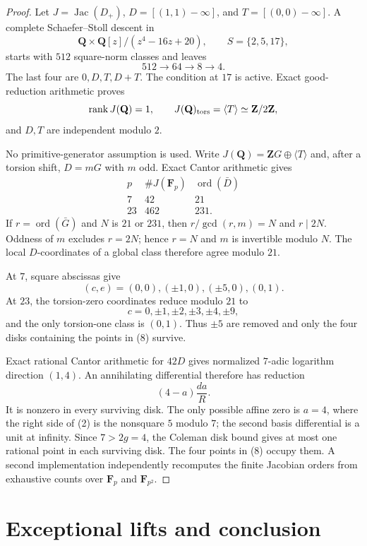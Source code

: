 \documentclass[11pt]{article}
\newcommand{\Q}{\mathbf Q}
\begin{document}
\begin{proof}
Let $J=\operatorname{Jac}(D_+)$,
$D=[(1,1)-\infty]$, and $T=[(0,0)-\infty]$.
A complete Schaefer--Stoll descent in
\[
 \Q\times\Q[z]/(z^4-16z+20),\qquad S=\{2,5,17\},
\]
starts with $512$ square-norm classes and leaves
\[
 512\longrightarrow64\longrightarrow8\longrightarrow4.
\]
The last four are $0,D,T,D+T$.  The condition at $17$ is active.  Exact
good-reduction arithmetic proves
\[
 \operatorname{rank}J(\Q)=1,\qquad
 J(\Q)_{\rm tors}=\langle T\rangle\simeq\mathbf Z/2\mathbf Z,
\]
and $D,T$ are independent modulo $2$.

No primitive-generator assumption is used.  Write
$J(\Q)=\mathbf ZG\oplus\langle T\rangle$ and, after a torsion shift,
$D=mG$ with $m$ odd.  Exact Cantor arithmetic gives
\[
\begin{array}{c|cc}
p&\#J(\mathbf F_p)&\operatorname{ord}(\bar D)\\ \hline
7&42&21\\
23&462&231.
\end{array}
\]
If $r=\operatorname{ord}(\bar G)$ and $N$ is $21$ or $231$, then
$r/\gcd(r,m)=N$ and $r\mid2N$.  Oddness of $m$ excludes $r=2N$; hence
$r=N$ and $m$ is invertible modulo $N$.  The local $D$-coordinates of a
global class therefore agree modulo $21$.

At $7$, square abscissas give
\[
 (c,e)=(0,0),(\pm1,0),(\pm5,0),(0,1).
\]
At $23$, the torsion-zero coordinates reduce modulo $21$ to
\[
 c=0,\pm1,\pm2,\pm3,\pm4,\pm9,
\]
and the only torsion-one class is $(0,1)$.  Thus $\pm5$ are removed and only
the four disks containing the points in (8) survive.

Exact rational Cantor arithmetic for $42D$ gives normalized $7$-adic
logarithm direction $(1,4)$.  An annihilating differential therefore has
reduction
\[
 (4-a)\frac{da}{R}.
\]
It is nonzero in every surviving disk.  The only possible affine zero is
$a=4$, where the right side of (2) is the nonsquare $5$ modulo $7$; the
second basis differential is a unit at infinity.  Since $7>2g=4$, the
Coleman disk bound gives at most one rational point in each surviving disk.
The four points in (8) occupy them.  A second implementation independently
recomputes the finite Jacobian orders from exhaustive counts over
$\mathbf F_p$ and $\mathbf F_{p^2}$.
\end{proof}

\section{Exceptional lifts and conclusion}
\end{document}
